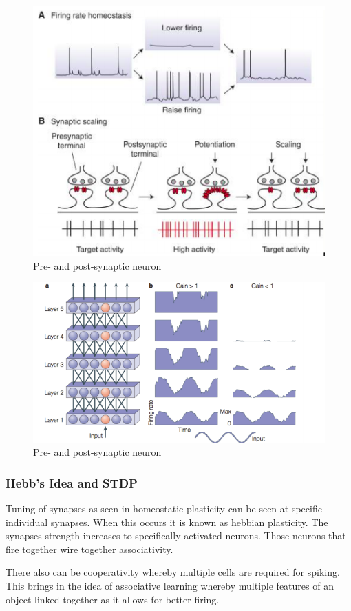 \documentclass[main]{subfiles}
\begin{document}
\begin{figure}[H]
    \centering
    \includegraphics[width=.7\textwidth]{03_PlasticityInTheBrain/figures/pasted_image_4.png}
    \caption{Pre- and post-synaptic neuron}
    \label{fig:syn_plas1t}
\end{figure}

\begin{figure}[H]
    \centering
    \includegraphics[width=.7\textwidth]{03_PlasticityInTheBrain/figures/pasted_image_5.png}
    \caption{Pre- and post-synaptic neuron}
    \label{fig:syn_plas1t}
\end{figure}



\newpage
\subsubsection{Hebb’s Idea and STDP}
Tuning of synapses as seen in homeostatic plasticity can be seen at specific individual synapses. When this occurs it is known as hebbian plasticity. The synapses strength increases to specifically activated neurons. Those neurons that fire together wire together associativity.  

There also can be cooperativity whereby multiple cells are required for spiking. This brings in the idea of associative learning whereby multiple features of an object linked together as it allows for better firing. 
\end{document}
